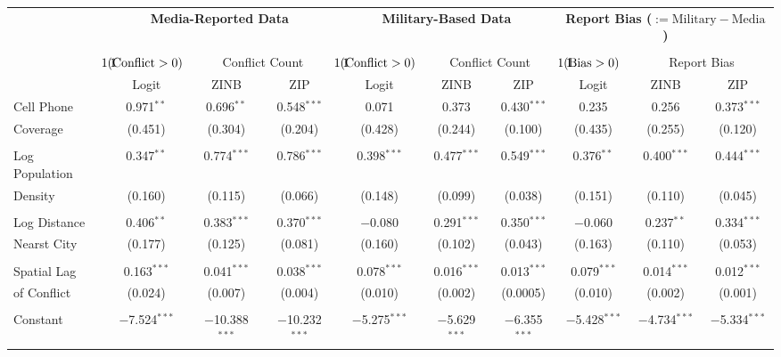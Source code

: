 \documentclass[article,36pt,extrafontsizes,oneside,openany,oldfontcommands]{memoir}
\def\one{\mathrm{1}\hspace{-12pt}\mathrm{1}}
\begin{document}
\begin{adjmulticols*}{3}{0.5in}{0.5in}
\begin{minipage}{.65\linewidth}
\begin{table}[H] 
\small 
\vspace{-.5in}
\hspace{.6in}
\begin{tabular}{@{\extracolsep{5pt}}lccccccccc} 
\toprule
 & \multicolumn{3}{c}{\textbf{Media-Reported Data}}
 & \multicolumn{3}{c}{\textbf{Military-Based Data}}
 & \multicolumn{3}{c}{\textbf{Report Bias ($:=\mbox{Military}-\mbox{Media}$)}} \\ 
\cline{2-4} \cline{5-7} \cline{8-10}
\\[-1.8ex] & $\one(\mbox{Conflict}>0)$ & \multicolumn{2}{c}{Conflict Count} & $\one(\mbox{Conflict}>0)$ & \multicolumn{2}{c}{Conflict Count} & $\one(\mbox{Bias}>0)$ & \multicolumn{2}{c}{Report Bias} \\ 
 & Logit & ZINB & ZIP & Logit & ZINB & ZIP & Logit & ZINB & ZIP  \\ 
\midrule
 Cell Phone & 0.971$^{**}$ & 0.696$^{**}$ & 0.548$^{***}$ & 0.071 & 0.373 & 0.430$^{***}$ & 0.235 & 0.256 & 0.373$^{***}$ \\ 
\;\;\;Coverage  & (0.451) & (0.304) & (0.204) & (0.428) & (0.244) & (0.100) & (0.435) & (0.255) & (0.120) \\ 
  & & & & & & & & & \\[-1.8ex]
 Log Population & 0.347$^{**}$ & 0.774$^{***}$ & 0.786$^{***}$ & 0.398$^{***}$ & 0.477$^{***}$ & 0.549$^{***}$ & 0.376$^{**}$ & 0.400$^{***}$ & 0.444$^{***}$ \\ 
\;\;\;Density  & (0.160) & (0.115) & (0.066) & (0.148) & (0.099) & (0.038) & (0.151) & (0.110) & (0.045) \\ 
  & & & & & & & & & \\[-1.8ex] 
 Log Distance & 0.406$^{**}$ & 0.383$^{***}$ & 0.370$^{***}$ & $-$0.080 & 0.291$^{***}$ & 0.350$^{***}$ & $-$0.060 & 0.237$^{**}$ & 0.334$^{***}$ \\ 
\;\;\;Nearst City  & (0.177) & (0.125) & (0.081) & (0.160) & (0.102) & (0.043) & (0.163) & (0.110) & (0.053) \\ 
  & & & & & & & & & \\[-1.8ex] 
Spatial Lag & 0.163$^{***}$ & 0.041$^{***}$ & 0.038$^{***}$ & 0.078$^{***}$ & 0.016$^{***}$ & 0.013$^{***}$ & 0.079$^{***}$ & 0.014$^{***}$ & 0.012$^{***}$ \\ 
\;\;\;of Conflict & (0.024) & (0.007) & (0.004) & (0.010) & (0.002) & (0.0005) & (0.010) & (0.002) & (0.001) \\ 
  & & & & & & & & & \\[-1.8ex] 
 Constant & $-$7.524$^{***}$ & $-$10.388$^{***}$ & $-$10.232$^{***}$ & $-$5.275$^{***}$ & $-$5.629$^{***}$ & $-$6.355$^{***}$ & $-$5.428$^{***}$ & $-$4.734$^{***}$ & $-$5.334$^{***}$ \\ 

\end{tabular}
\end{table}
\end{minipage}
\end{adjmulticols*}
\end{document}
